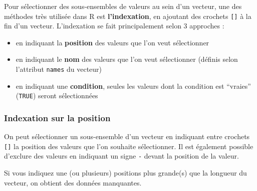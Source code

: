 \documentclass[
]{book}
\providecommand{\tightlist}{%
  \setlength{\itemsep}{0pt}\setlength{\parskip}{0pt}}
\begin{document}
Pour sélectionner des sous-ensembles de valeurs au sein d'un vecteur, une des méthodes très utilisée dans R est \textbf{l'indexation}, en ajoutant des crochets \texttt{{[}{]}} à la fin d'un vecteur. L'indexation se fait principalement selon 3 approches :

\begin{itemize}
\tightlist
\item
  en indiquant la \textbf{position} des valeurs que l'on veut sélectionner
\item
  en indiquant le \textbf{nom} des valeurs que l'on veut sélectionner (définis selon l'attribut \texttt{names} du vecteur)
\item
  en indiquant une \textbf{condition}, seules les valeurs dont la condition est ``vraies'' (\texttt{TRUE}) seront sélectionnées
\end{itemize}

\subsubsection{Indexation sur la position}\label{indexation-sur-la-position}

On peut sélectionner un sous-ensemble d'un vecteur en indiquant entre crochets \texttt{{[}{]}} la position des valeurs que l'on souhaite sélectionner. Il est également possible d'exclure des valeurs en indiquant un signe \texttt{-} devant la position de la valeur.

Si vous indiquez une (ou plusieurs) positions plus grande(s) que la longueur du vecteur, on obtient des données manquantes.
\end{document}
